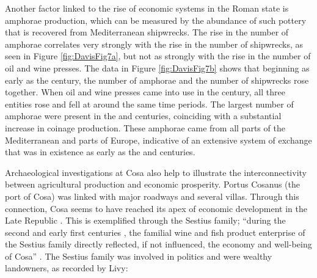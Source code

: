 





Another factor linked to the rise of economic systems in the Roman state is amphorae production, which can be measured by the abundance of such pottery that is recovered from Mediterranean shipwrecks. The rise in the number of amphorae correlates very strongly with the rise in the number of shipwrecks, as seen in Figure \ref{fig:DavisFig7a}, but not as strongly with the rise in the number of oil and wine presses. The data in Figure \ref{fig:DavisFig7b} shows that beginning as early as the  century\BC, the number of amphorae and the number of shipwrecks rose together. When oil and wine presses came into use in the  century\BC, all three entities rose and fell at around the same time periods. The largest number of amphorae were present in the  and  centuries\BC, coinciding with a substantial increase in coinage production. These amphorae came from all parts of the Mediterranean and parts of Europe, indicative of an extensive system of exchange that was in existence as early as the  and  centuries\BC.




Archaeological investigations at Cosa also help to illustrate the interconnectivity between agricultural production and economic prosperity. Portus Cosanus (the port of Cosa) was linked with major roadways and several villas. Through this connection, Cosa seems to have reached its apex of economic development in the Late Republic \parencite[124]{Manacorda_1978}. This is exemplified through the Sestius family; “during the second and early first centuries \BC, the familial wine and fish product enterprise of the Sestius family directly reflected, if not influenced, the economy and well-being of Cosa” \parencite[15]{Moore_1995}. The Sestius family was involved in politics and were wealthy landowners, as recorded by Livy:


